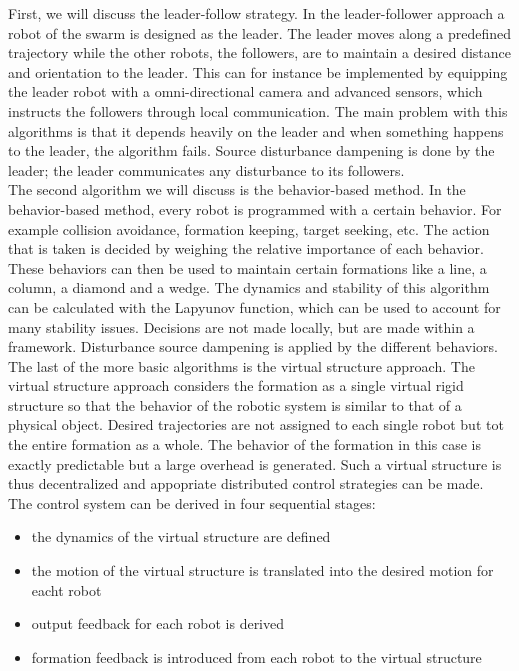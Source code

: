 First, we will discuss the leader-follow strategy. 
In the leader-follower approach a robot of the swarm is designed as the leader.
The leader moves along a predefined trajectory while the other robots, the followers, are to maintain a desired distance and orientation to the leader. \cite{Consolini}
This can for instance be implemented by equipping the leader robot with a omni-directional camera and advanced sensors, which instructs the followers through local communication. \cite{Das}
The main problem with this algorithms is that it depends heavily on the leader and when something happens to the leader, the algorithm fails. 
Source disturbance dampening is done by the leader; the leader communicates any disturbance to its followers. \\

The second algorithm we will discuss is the behavior-based method. 
In the behavior-based method, every robot is programmed with a certain behavior.
For example collision avoidance, formation keeping, target seeking, etc. 
The action that is taken is decided by weighing the relative importance of each behavior. \cite{consolini}
These behaviors can then be used to maintain certain formations like a line, a column, a diamond and a wedge. \cite{Balch}
The dynamics and stability of this algorithm can be calculated with the Lapyunov function, which can be used to account for many stability issues. \cite{Lawton}
Decisions are not made locally, but are made within a framework.
Disturbance source dampening is applied by the different behaviors. \\

The last of the more basic algorithms is the virtual structure approach. 
The virtual structure approach considers the formation as a single virtual rigid structure so that the behavior of the robotic system is similar to that of a physical object. 
Desired trajectories are not assigned to each single robot but tot the entire formation as a whole. 
The behavior of the formation in this case is exactly predictable but a large overhead is generated. \cite{consolini}
Such a virtual structure is thus decentralized and appopriate distributed control strategies can be made. \cite{Ren}
The control system can be derived in four sequential stages: \cite{Do}
\begin{itemize}
	\item the dynamics of the virtual structure are defined
	\item the motion of the virtual structure is translated into the desired motion for eacht robot
	\item output feedback for each robot is derived
	\item formation feedback is introduced from each robot to the virtual structure
\end{itemize} 


